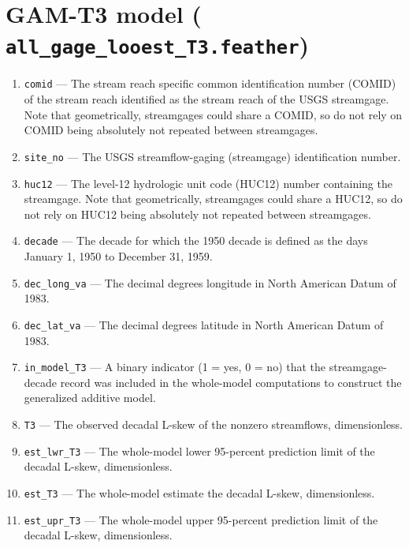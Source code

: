 \documentclass[1p, authoryear, 11pt, times, preprint]{elsarticle}
\newcommand{\code}[1]{{\color{black}%
                       \mbox{\lstinline[basicstyle={\small\ttfamily},
                                        keywordstyle=\scriptsize\ttfamily]|#1|}}}
\begin{document}



\section{GAM-T3 model (\code{all_gage_looest_T3.feather})}
\begin{enumerate}
\footnotesize
\RaggedRight
\item \code{comid} --- The stream reach specific common identification number (COMID) of the stream reach identified as the stream reach of the USGS streamgage. Note that geometrically, streamgages could share a COMID, so do not rely on COMID being absolutely not repeated between streamgages.
\item \code{site_no} --- The USGS streamflow-gaging (streamgage) identification number.
\item \code{huc12} --- The level-12 hydrologic unit code (HUC12) number containing the streamgage. Note that geometrically, streamgages could share a HUC12, so do not rely on HUC12 being absolutely not repeated between streamgages.
\item \code{decade} --- The decade for which the 1950 decade is defined as the days January 1, 1950 to December 31, 1959.
\item \code{dec_long_va} --- The decimal degrees longitude in North American Datum of 1983.
\item \code{dec_lat_va} --- The decimal degrees latitude in North American Datum of 1983.
\item \code{in_model_T3} --- A binary indicator (1 = yes, 0 = no) that the streamgage-decade record was included in the whole-model computations to construct the generalized additive model.
\item \code{T3} --- The observed decadal L-skew of the nonzero streamflows, dimensionless.
\item \code{est_lwr_T3} --- The whole-model lower 95-percent prediction limit of the decadal L-skew, dimensionless.
\item \code{est_T3} --- The whole-model estimate the decadal L-skew, dimensionless.
\item \code{est_upr_T3} --- The whole-model upper 95-percent prediction limit of the decadal L-skew, dimensionless.

\end{enumerate}
\end{document}
